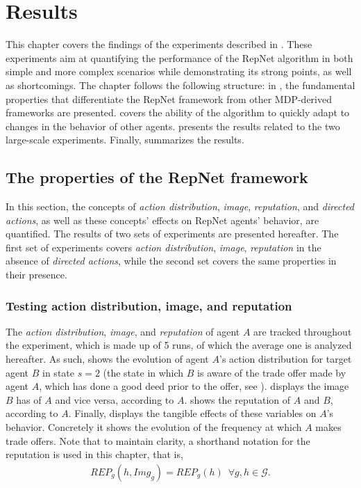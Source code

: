
\chapter{Results}
\label{chap:res}

This chapter covers the findings of the experiments described in . These experiments aim at quantifying the performance of the RepNet algorithm in both simple and more complex scenarios while demonstrating its strong points, as well as shortcomings. 
The chapter follows the following structure: in , the fundamental properties that differentiate the RepNet framework from other MDP-derived frameworks are presented.  covers the ability of the algorithm to quickly adapt to changes in the behavior of other agents.  presents the results related to the two large-scale experiments. Finally,  summarizes the results.

\section{The properties of the RepNet framework}
\label{sec:feat}
In this section, the concepts of \textit{action distribution}, \textit{image}, \textit{reputation}, and \textit{directed actions}, as well as these concepts' effects on RepNet agents' behavior, are quantified. The results of two sets of experiments are presented hereafter. The first set of experiments covers  \textit{action distribution}, \textit{image}, \textit{reputation} in the absence of \textit{directed actions}, while the second set covers the same properties in their presence.

\subsection{Testing action distribution, image, and reputation}
The \textit{action distribution}, \textit{image}, and \textit{reputation} of agent $A$ are tracked throughout the experiment, which is made up of 5 runs, of which the average one is analyzed hereafter. As such,  shows the evolution of agent $A$'s action distribution for target agent $B$ in state $s = 2$ (the state in which $B$ is aware of the trade offer made by agent $A$, which has done a good deed prior to the offer, see ).  displays the image $B$ has of $A$ and vice versa, according to $A$.
 shows the reputation of $A$ and $B$, according to $A$. Finally,  displays the tangible effects of these variables on $A$'s behavior. Concretely it shows the evolution of the frequency at which $A$ makes trade offers. Note that to maintain clarity, a shorthand notation for the reputation is used in this chapter, that is,
\begin{align}
    REP_g(h,Img_g) = REP_g(h) \,\,\,   \forall g, h \in \mathcal{G}.
\end{align}

